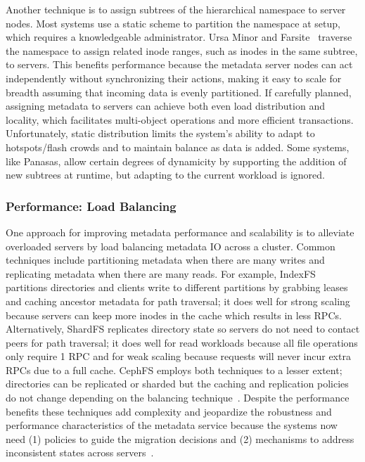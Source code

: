 Another technique is to assign subtrees of the hierarchical namespace to server
nodes. Most systems use a static scheme to partition the namespace at setup,
which requires a knowledgeable administrator. Ursa Minor and
Farsite~\cite{doucer:osdi2006-farsite-dir} traverse the namespace to assign
related inode ranges, such as inodes in the same subtree, to servers. This
benefits performance because the metadata server nodes can act independently
without synchronizing their actions, making it easy to scale for breadth
assuming that incoming data is evenly partitioned.  If carefully planned,
assigning metadata to servers can achieve both even load distribution and
locality, which facilitates multi-object operations and more efficient
transactions. Unfortunately, static distribution limits the system's ability to
adapt to hotspots/flash crowds and to maintain balance as data is added.  Some
systems, like Panasas, allow certain degrees of dynamicity by supporting the
addition of new subtrees at runtime, but adapting to the current workload is
ignored. 


\subsubsection{Performance: Load Balancing}

One approach for improving metadata performance and scalability is to alleviate
overloaded servers by load balancing metadata IO across a cluster. Common
techniques include partitioning metadata when there are many writes and
replicating metadata when there are many reads. For example, IndexFS partitions
directories and clients write to different partitions by grabbing leases and
caching ancestor metadata for path traversal; it does well for strong scaling
because servers can keep more inodes in the cache which results in less RPCs.
Alternatively, ShardFS replicates directory state so servers do not need to
contact peers for path traversal; it does well for read workloads because all
file operations only require 1 RPC and for weak scaling because requests will
never incur extra RPCs due to a full cache.  CephFS employs both techniques to
a lesser extent; directories can be replicated or sharded but the caching and
replication policies do not change depending on the balancing
technique~\cite{weil:sc2004-dyn-metadata, weil:phdthesis07}.  Despite the
performance benefits these techniques add complexity and jeopardize the
robustness and performance characteristics of the metadata service because the
systems now need (1) policies to guide the migration decisions and (2)
mechanisms to address inconsistent states across
servers~\cite{sevilla:sc15-mantle}.

